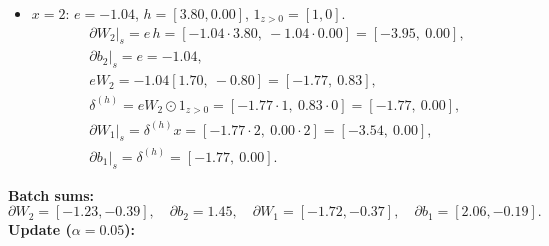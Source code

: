 \documentclass[11pt]{article}
\begin{document}
\begin{itemize}
\begin{align*}
&\partial b_2\big|_s = e = 1.07,\\
&eW_2 = 1.07[1.70,\ -0.80] = [1.82,\ -0.86],\\
&\delta^{(h)} = eW_2 \odot 1_{z>0} = [1.82\cdot1,\ -0.86\cdot0] = [1.82,\ 0.00],\\
&\partial W_1\big|_s = \delta^{(h)} x = [1.82\cdot1,\ 0.00\cdot1] = [1.82,\ 0.00],\\
&\partial b_1\big|_s = \delta^{(h)} = [1.82,\ 0.00].
\end{align*}
\item $x=2$: $e=-1.04$, $h=[3.80, 0.00]$, $1_{z>0}=[1,0]$.
\begin{align*}
&\partial W_2\big|_s = e\,h = [-1.04\cdot3.80,\ -1.04\cdot0.00] = [-3.95,\ 0.00],\\
&\partial b_2\big|_s = e = -1.04,\\
&eW_2 = -1.04[1.70,\ -0.80] = [-1.77,\ 0.83],\\
&\delta^{(h)} = eW_2 \odot 1_{z>0} = [-1.77\cdot1,\ 0.83\cdot0] = [-1.77,\ 0.00],\\
&\partial W_1\big|_s = \delta^{(h)} x = [-1.77\cdot2,\ 0.00\cdot2] = [-3.54,\ 0.00],\\
&\partial b_1\big|_s = \delta^{(h)} = [-1.77,\ 0.00].
\end{align*}
\end{itemize}
\noindent\textbf{Batch sums:}
\[
\partial W_2=[-1.23, -0.39],\quad \partial b_2=1.45,\quad \partial W_1=[-1.72, -0.37],\quad \partial b_1=[2.06, -0.19].
\]
\noindent\textbf{Update ($\alpha=0.05$):}
\end{document}
